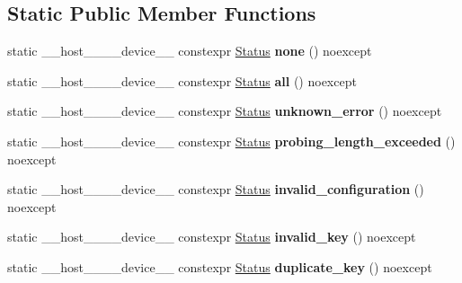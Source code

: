 \subsection*{Static Public Member Functions}
\begin{DoxyCompactItemize}
\item 
\mbox{\label{classwarpcore_1_1Status_aa2c423700b1ca9e3cf51a31c08e1c55a}} 
static \+\_\+\+\_\+host\+\_\+\+\_\+\+\_\+\+\_\+device\+\_\+\+\_\+ constexpr \hyperlink{classwarpcore_1_1Status}{Status} {\bfseries none} () noexcept
\item 
\mbox{\label{classwarpcore_1_1Status_a41789cf863176c60f1da5289a85703a1}} 
static \+\_\+\+\_\+host\+\_\+\+\_\+\+\_\+\+\_\+device\+\_\+\+\_\+ constexpr \hyperlink{classwarpcore_1_1Status}{Status} {\bfseries all} () noexcept
\item 
\mbox{\label{classwarpcore_1_1Status_a20e68ef7aa7638b9556f3901ecdf9747}} 
static \+\_\+\+\_\+host\+\_\+\+\_\+\+\_\+\+\_\+device\+\_\+\+\_\+ constexpr \hyperlink{classwarpcore_1_1Status}{Status} {\bfseries unknown\+\_\+error} () noexcept
\item 
\mbox{\label{classwarpcore_1_1Status_ab0cd899ea6829c7012999d385d99ca30}} 
static \+\_\+\+\_\+host\+\_\+\+\_\+\+\_\+\+\_\+device\+\_\+\+\_\+ constexpr \hyperlink{classwarpcore_1_1Status}{Status} {\bfseries probing\+\_\+length\+\_\+exceeded} () noexcept
\item 
\mbox{\label{classwarpcore_1_1Status_ac93bb9879bee073806aa10f099dce4d5}} 
static \+\_\+\+\_\+host\+\_\+\+\_\+\+\_\+\+\_\+device\+\_\+\+\_\+ constexpr \hyperlink{classwarpcore_1_1Status}{Status} {\bfseries invalid\+\_\+configuration} () noexcept
\item 
\mbox{\label{classwarpcore_1_1Status_a32ca329ebc1a5ae0a62f0e868ce24500}} 
static \+\_\+\+\_\+host\+\_\+\+\_\+\+\_\+\+\_\+device\+\_\+\+\_\+ constexpr \hyperlink{classwarpcore_1_1Status}{Status} {\bfseries invalid\+\_\+key} () noexcept
\item 
\mbox{\label{classwarpcore_1_1Status_adf4c8e853e32dacb6c030432a28b22e2}} 
static \+\_\+\+\_\+host\+\_\+\+\_\+\+\_\+\+\_\+device\+\_\+\+\_\+ constexpr \hyperlink{classwarpcore_1_1Status}{Status} {\bfseries duplicate\+\_\+key} () noexcept

\end{DoxyCompactItemize}
